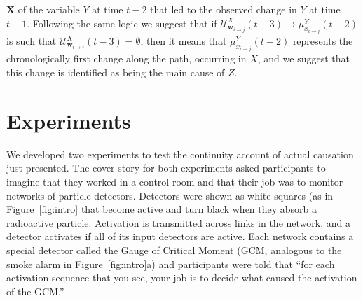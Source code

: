 \documentclass[10pt,letterpaper]{article}
\begin{document}
$\bm{X}$ of the variable $Y$ at time $t-2$ that led to the observed change in $Y$ at time $t-1$. Following the same logic we suggest that if $\mathcal{U}^X_{\bm{w}_{i\rightarrow j}}(t-3)\rightarrow \mu^{Y}_{x_{i\rightarrow j}}(t-2)$ is such that $\mathcal{U}^X_{\bm{w}_{i\rightarrow j}}(t-3)=\emptyset$, then it means that $\mu^{Y}_{x_{i\rightarrow j}}(t-2)$ represents the chronologically first change along the path, occurring in $X$, and we suggest that this change is identified as being the main cause of $Z$.

\section{Experiments}

We developed two experiments to test the continuity account of actual causation just presented.  
The cover story for both experiments asked participants to imagine that they worked in a control room and that their job was to monitor networks of particle detectors. Detectors were shown as white squares (as in Figure~\ref{fig:intro} that become active and turn black when they absorb a radioactive particle. Activation is transmitted across links in the network, and a detector activates if all of its input detectors are active. Each network contains a special detector called the Gauge of Critical Moment (GCM, analogous to the smoke alarm in Figure~\ref{fig:intro}a) and participants were told that ``for each activation sequence that you see, your job is to decide what caused the activation of the GCM.'' 
\end{document}

